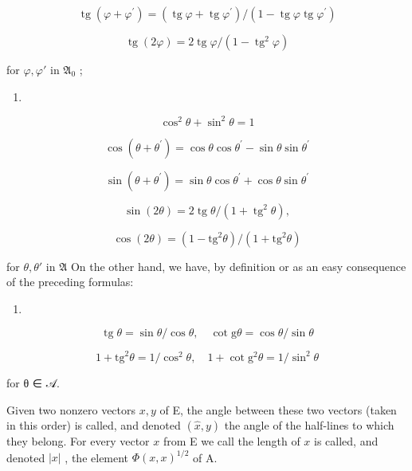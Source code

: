 \[
\operatorname{tg} \left(\varphi + \varphi^ {\prime}\right) = (\operatorname{tg} \varphi + \operatorname{tg} \varphi^ {\prime}) / (1 - \operatorname{tg} \varphi \operatorname{tg} \varphi^ {\prime})\tag{12}
\]

\[
\operatorname{tg} (2 \varphi) = 2 \operatorname{tg} \varphi / (1 - \operatorname{tg} ^ {2} \varphi)
\]

for \(\varphi, \varphi'\) in \(\mathfrak{A}_0\) ;

\begin{enumerate}
\def\labelenumi{(\arabic{enumi})}
\setcounter{enumi}{12}
\tightlist
\item
\end{enumerate}

\[
\cos^ {2} \theta + \sin^ {2} \theta = 1\tag{14}
\]

\[
\cos (\theta + \theta^ {\prime}) = \cos \theta \cos \theta^ {\prime} - \sin \theta \sin \theta^ {\prime}\tag{15}
\]

\[
\sin (\theta + \theta^ {\prime}) = \sin \theta \cos \theta^ {\prime} + \cos \theta \sin \theta^ {\prime}\tag{16}
\]

\[
\sin (2 \theta) = 2 \operatorname{tg} \theta / (1 + \operatorname{tg} ^ {2} \theta),
\]

\[
\cos (2 \theta) = (1 - \mathrm{tg} ^ {2} \theta) / (1 + \mathrm{tg} ^ {2} \theta)
\]

for \(\theta, \theta'\) in \(\mathfrak{A}\) On the other hand, we have, by definition or as an easy consequence of the preceding formulas:

\begin{enumerate}
\def\labelenumi{(\arabic{enumi})}
\setcounter{enumi}{16}
\tightlist
\item
\end{enumerate}

\[
\operatorname{tg} \theta = \sin \theta / \cos \theta , \quad \cot \mathrm{g} \theta = \cos \theta / \sin \theta\tag{18}
\]

\[
1 + \mathrm{tg} ^ {2} \theta = 1 / \cos^ {2} \theta , \quad 1 + \cot \mathrm{g} ^ {2} \theta = 1 / \sin^ {2} \theta
\]

for θ ∈ 𝒜.

Given two nonzero vectors \(x, y\) of E, the angle between these two vectors (taken in this order) is called, and denoted \((\widehat{x}, y)\) the angle of the half-lines to which they belong. For every vector \(x\) from E we call the length of \(x\) is called, and denoted \(|x|\) , the element \(\Phi(x, x)^{1/2}\) of A.


